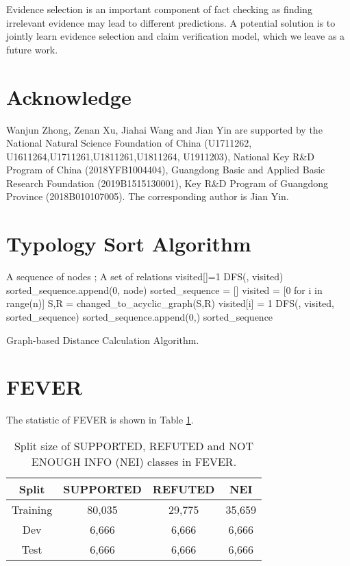 \documentclass[11pt,a4paper]{article}
\begin{document}
Evidence selection is an important component of fact checking as finding irrelevant evidence may lead to different predictions. A potential solution is to jointly learn evidence selection and claim verification model, which we leave as a future work.
\section*{Acknowledge}
Wanjun Zhong, Zenan Xu, Jiahai Wang and Jian Yin are supported by the National Natural Science Foundation of China (U1711262, U1611264,U1711261,U1811261,U1811264, U1911203), National Key R\&D Program of China (2018YFB1004404), Guangdong Basic and Applied Basic Research Foundation (2019B1515130001),  Key R\&D Program of Guangdong Province (2018B010107005).  The corresponding author is Jian Yin.


\appendix
\section{Typology Sort Algorithm}
\label{sort-algirithm}
\begin{algorithm}[h]
	\centering
	\footnotesize
	\begin{algorithmic}[1]
		\Require
		A sequence of nodes ; A set of relations  
		\State
		visited[]=1
		\State
		DFS(, visited)
		\EndIf
		\EndFor
		\State
		sorted\_sequence.append(0, node)
		\EndFunction
		\State
		sorted\_sequence = []
		\State
		visited = [0 for i in range(n)]
		\State
		S,R = changed\_to\_acyclic\_graph(S,R)
		\State
		visited[i] = 1
		\State
		DFS(, visited, sorted\_sequence)
		\EndFor
		\State
		sorted\_sequence.append(0,)
		\EndIf
		\EndFor
		\State
		\Return sorted\_sequence
	\end{algorithmic}
	\caption{Graph-based Distance Calculation Algorithm.}
	\label{alg:training}
\end{algorithm}


\section{FEVER}
\label{appendix:data-statistic}
The statistic of FEVER is shown in Table \ref{table:dataset-detail}. 
\begin{table}[h]\small
	\centering
	\begin{tabular}{c|ccc}
		\hline
		\textbf{Split} & SUPPORTED & REFUTED & NEI    \\ \hline
		Training       & 80,035    & 29,775  & 35,659 \\
		Dev            & 6,666     & 6,666   & 6,666  \\
		Test           & 6,666     & 6,666   & 6,666  \\ \hline
	\end{tabular}
	\caption{Split size of SUPPORTED, REFUTED and NOT ENOUGH INFO (NEI) classes in FEVER.}
	\label{table:dataset-detail}
\end{table}
\end{document}
